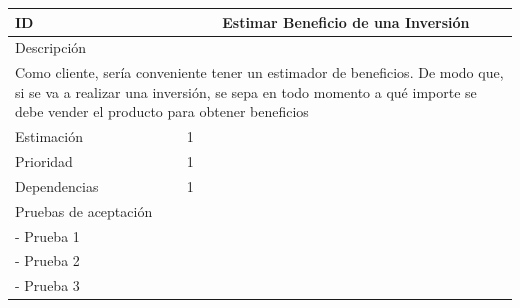 \begin{table}[H]
	\begin{center}
		\begin{tabular} {|l|c|l|}
			\hline
			ID & \multicolumn{2}{c|}{Estimar Beneficio de una Inversión} \\ \hline
			\multicolumn{3}{|l|}{Descripción} \\ \hline
			\multicolumn{3}{|p{12cm}|}{Como cliente, sería conveniente tener un estimador de beneficios. De modo que, si se va a realizar una inversión, se sepa en todo momento a qué importe se debe vender el producto para obtener beneficios} \\ \hline
			\multicolumn{2}{|l|}{Estimación} & 1 \\ \hline
			\multicolumn{2}{|l|}{Prioridad} & 1 \\ \hline
			\multicolumn{2}{|l|}{Dependencias} & 1 \\ \hline
			\multicolumn{3}{|l|}{Pruebas de aceptación} \\ \hline
			\multicolumn{3}{|p{12cm}|}{ - Prueba 1} \\ 
			\multicolumn{3}{|p{12cm}|}{ - Prueba 2} \\
			\multicolumn{3}{|p{12cm}|}{ - Prueba 3} \\ \hline
		\end{tabular}
	\end{center}
\end{table}